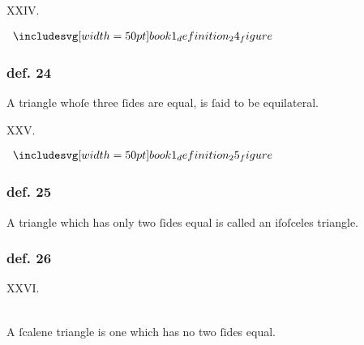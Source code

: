 \begin{center}
    XXIV.\label{book1def24}\\
\end{center}
\begin{minipage}{0.33\textwidth}
    \begin{center}
        $\img[0][0][50]{book1_definition_24_figure}$
    \end{center}
\end{minipage}%
\begin{minipage}{0.67\textwidth}
    \subsubsection{def. 24}
    \begin{center}
        \raggedright A triangle whoſe three ſides are equal, is ſaid to be equilateral.
    \end{center}
\end{minipage}

\hfill

\begin{center}
    XXV.\label{book1def25}\\
\end{center}
\begin{minipage}{0.33\textwidth}
    \begin{center}
        $\img[0][0][50]{book1_definition_25_figure}$
    \end{center}
\end{minipage}%
\begin{minipage}{0.67\textwidth}
    \subsubsection{def. 25}
    \begin{center}
        \raggedright A triangle which has only two ſides equal is called an iſoſceles triangle.
    \end{center}
\end{minipage}

\hfill

\begin{minipage}{0.165\textwidth}
    \phantom{}
\end{minipage}%
\begin{minipage}{0.67\textwidth}
    \subsubsection{def. 26}
    \begin{center}
        XXVI.\label{book1def26}\\
        \hfill\\
        \raggedright A ſcalene triangle is one which has no two ſides equal.\\
    \end{center}
\end{minipage}%
\begin{minipage}{0.165\textwidth}
    \phantom{}
\end{minipage}%

